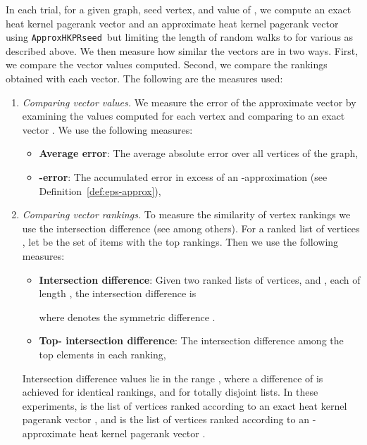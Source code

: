 \documentclass[runningheads,a4paper]{llncs}
\newcommand{\hkprseedalg}{\texttt{ApproxHKPRseed}}
\begin{document}
In each trial, for a given graph, seed vertex, and value of , we compute an
exact heat kernel pagerank vector  and an approximate heat kernel
pagerank vector  using \hkprseedalg~but limiting the length of
random walks to  for various  as described above.  We then measure how
similar the vectors are in two ways.  First, we compare the vector values
computed.  Second, we compare the rankings obtained with each vector.  The
following are the measures used:

\begin{enumerate}
\item \emph{Comparing vector values.}  We measure the error of the approximate
vector  by examining the values computed for each vertex and
comparing to an exact vector .  We use the following measures:
  \begin{itemize}
  \item \textbf{Average  error}: The average absolute error over all vertices of the graph,
  
  \item \textbf{-error}: The accumulated error in excess of an
-approximation (see Definition~\ref{def:eps-approx}),
  
  \end{itemize}
\item \emph{Comparing vector rankings.}  To measure the similarity of vertex
rankings we use the intersection difference (see
\cite{benzi2013total,fagin2003comparing} among others).  For a ranked list of
vertices , let  be the set of items with the top  rankings.  Then we
use the following measures:
  \begin{itemize}
  \item \textbf{Intersection difference}: Given two ranked lists of vertices,
 and , each of length , the intersection difference is
  
  where  denotes the symmetric difference .
  \item \textbf{Top- intersection difference}: The intersection difference 
among the top  elements in each ranking,
  
  \end{itemize}
Intersection difference values lie in the range , where a difference of
 is achieved for identical rankings, and  for totally disjoint lists.  In
these experiments,  is the list of vertices ranked according to an exact heat
kernel pagerank vector , and  is the list of vertices ranked
according to an -approximate heat kernel pagerank vector .
\end{enumerate}
\end{document}
